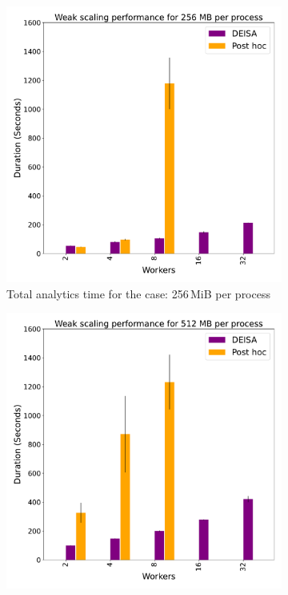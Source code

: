 \begin{figure}
\begin{subfigure}[b]{0.3\textwidth}
         \includegraphics[width=\textwidth, height=\textwidth]{figures/256A.pdf}
         \caption{Total analytics time for the case: 256\,MiB per process}
         \label{fig:A256}
     \end{subfigure}
     \hfill
     \begin{subfigure}[b]{0.3\textwidth}
         \centering
         \includegraphics[width=\textwidth, height=\textwidth]{figures/512A.pdf}

\end{subfigure}
\end{figure}
